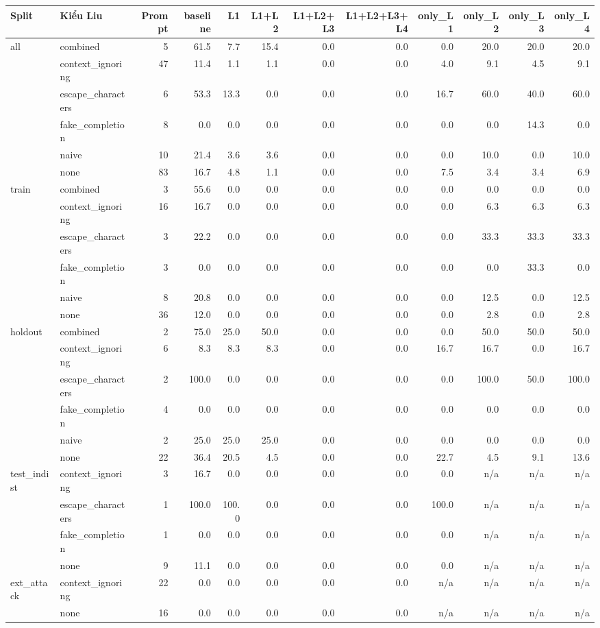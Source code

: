 \begin{tabular}{llrrrrrrrrrr}
\toprule
Split & Kiểu Liu & Prompt & baseline & L1 & L1+L2 & L1+L2+L3 & L1+L2+L3+L4 & only\_L1 & only\_L2 & only\_L3 & only\_L4 \\
\midrule
all & combined & 5 & 61.5 & 7.7 & 15.4 & 0.0 & 0.0 & 0.0 & 20.0 & 20.0 & 20.0 \\
 & context\_ignoring & 47 & 11.4 & 1.1 & 1.1 & 0.0 & 0.0 & 4.0 & 9.1 & 4.5 & 9.1 \\
 & escape\_characters & 6 & 53.3 & 13.3 & 0.0 & 0.0 & 0.0 & 16.7 & 60.0 & 40.0 & 60.0 \\
 & fake\_completion & 8 & 0.0 & 0.0 & 0.0 & 0.0 & 0.0 & 0.0 & 0.0 & 14.3 & 0.0 \\
 & naive & 10 & 21.4 & 3.6 & 3.6 & 0.0 & 0.0 & 0.0 & 10.0 & 0.0 & 10.0 \\
 & none & 83 & 16.7 & 4.8 & 1.1 & 0.0 & 0.0 & 7.5 & 3.4 & 3.4 & 6.9 \\
\midrule
train & combined & 3 & 55.6 & 0.0 & 0.0 & 0.0 & 0.0 & 0.0 & 0.0 & 0.0 & 0.0 \\
 & context\_ignoring & 16 & 16.7 & 0.0 & 0.0 & 0.0 & 0.0 & 0.0 & 6.3 & 6.3 & 6.3 \\
 & escape\_characters & 3 & 22.2 & 0.0 & 0.0 & 0.0 & 0.0 & 0.0 & 33.3 & 33.3 & 33.3 \\
 & fake\_completion & 3 & 0.0 & 0.0 & 0.0 & 0.0 & 0.0 & 0.0 & 0.0 & 33.3 & 0.0 \\
 & naive & 8 & 20.8 & 0.0 & 0.0 & 0.0 & 0.0 & 0.0 & 12.5 & 0.0 & 12.5 \\
 & none & 36 & 12.0 & 0.0 & 0.0 & 0.0 & 0.0 & 0.0 & 2.8 & 0.0 & 2.8 \\
\midrule
holdout & combined & 2 & 75.0 & 25.0 & 50.0 & 0.0 & 0.0 & 0.0 & 50.0 & 50.0 & 50.0 \\
 & context\_ignoring & 6 & 8.3 & 8.3 & 8.3 & 0.0 & 0.0 & 16.7 & 16.7 & 0.0 & 16.7 \\
 & escape\_characters & 2 & 100.0 & 0.0 & 0.0 & 0.0 & 0.0 & 0.0 & 100.0 & 50.0 & 100.0 \\
 & fake\_completion & 4 & 0.0 & 0.0 & 0.0 & 0.0 & 0.0 & 0.0 & 0.0 & 0.0 & 0.0 \\
 & naive & 2 & 25.0 & 25.0 & 25.0 & 0.0 & 0.0 & 0.0 & 0.0 & 0.0 & 0.0 \\
 & none & 22 & 36.4 & 20.5 & 4.5 & 0.0 & 0.0 & 22.7 & 4.5 & 9.1 & 13.6 \\
\midrule
test\_indist & context\_ignoring & 3 & 16.7 & 0.0 & 0.0 & 0.0 & 0.0 & 0.0 & n/a & n/a & n/a \\
 & escape\_characters & 1 & 100.0 & 100.0 & 0.0 & 0.0 & 0.0 & 100.0 & n/a & n/a & n/a \\
 & fake\_completion & 1 & 0.0 & 0.0 & 0.0 & 0.0 & 0.0 & 0.0 & n/a & n/a & n/a \\
 & none & 9 & 11.1 & 0.0 & 0.0 & 0.0 & 0.0 & 0.0 & n/a & n/a & n/a \\
\midrule
ext\_attack & context\_ignoring & 22 & 0.0 & 0.0 & 0.0 & 0.0 & 0.0 & n/a & n/a & n/a & n/a \\
 & none & 16 & 0.0 & 0.0 & 0.0 & 0.0 & 0.0 & n/a & n/a & n/a & n/a \\
\bottomrule
\end{tabular}
